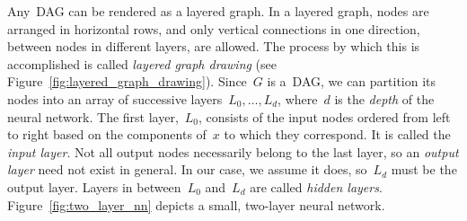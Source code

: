 \documentclass[11pt,a4paper]{article}
\numberwithin{equation}{section}
\begin{document}
Any~DAG can be rendered as a layered graph. In a layered graph, nodes are
arranged in horizontal rows, and only vertical connections in one direction,
between nodes in different layers, are allowed. The process by which this is
accomplished is called \emph{layered graph drawing} (see
Figure~\ref{fig:layered_graph_drawing}). Since~$G$ is a~DAG, we can partition
its nodes into an array of successive layers~$L_0, \ldots, L_d$, where~$d$ is
the \emph{depth} of the neural network. The first layer,~$L_0$, consists of the
input nodes ordered from left to right based on the components of~$x$ to which
they correspond. It is called the \emph{input layer}. Not all output nodes
necessarily belong to the last layer, so an \emph{output layer} need not exist
in general. In our case, we assume it does, so~$L_d$ must be the output layer.
Layers in between~$L_0$ and~$L_d$ are called \emph{hidden layers}.
Figure~\ref{fig:two_layer_nn} depicts a small, two-layer neural network.
\end{document}
